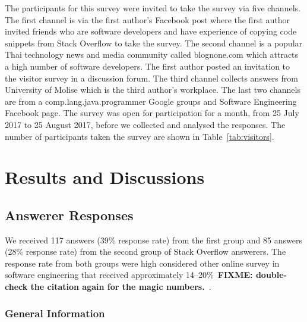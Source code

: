 \documentclass{svjour3}                     %
\newcommand\FIXME[1]{\textbf{FIXME: #1}}
\begin{document}
The participants for this survey were invited to take the survey via five
channels. The first channel is via the first author's Facebook post where the
first author invited friends who are software developers and have experience of
copying code snippets from Stack Overflow to take the survey. The second channel
is a popular Thai technology news and media community called blognone.com which
attracts a high number of software developers. The first author posted an
invitation to the visitor survey in a discussion forum. The third channel
collects answers from University of Molise which is the third author's
workplace. The last two channels are from a comp.lang.java.programmer Google
groups and Software Engineering Facebook page. The survey was open for
participation for a month, from 25 July 2017 to 25 August 2017, before we
collected and analysed the responses. The number of participants taken the
survey are shown in Table~\ref{tab:visitors}.

\section{Results and Discussions}

\subsection{Answerer Responses}
We received 117 answers (39\% response rate) from the first group and 85 answers
(28\% response rate) from the second group of Stack Overflow answerers. The response
rate from both groups were high considered other online survey in software
engineering that received approximately 14--20\%~\FIXME{double-check the
	citation again for the magic numbers.}~\citep{Punter2003}.

\subsubsection*{General Information}

\end{document}
